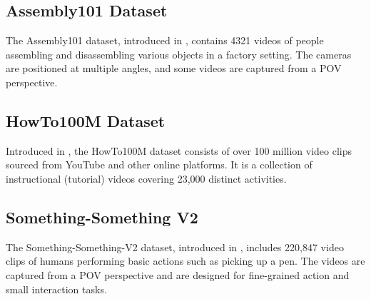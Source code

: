 \subsection*{Assembly101 Dataset}
The Assembly101 dataset, introduced in \cite{assembly101-dataset}, contains 4321 videos of people assembling and disassembling various objects in a factory setting. The cameras are positioned at multiple angles, and some videos are captured from a POV perspective.

\subsection*{HowTo100M Dataset}
Introduced in \cite{howto100m-dataset}, the HowTo100M dataset consists of over 100 million video clips sourced from YouTube and other online platforms. It is a collection of instructional (tutorial) videos covering 23,000 distinct activities.

\subsection*{Something-Something V2}
The Something-Something-V2 dataset, introduced in \cite{something-something-dataset}, includes 220,847 video clips of humans performing basic actions such as picking up a pen. The videos are captured from a POV perspective and are designed for fine-grained action and small interaction tasks.